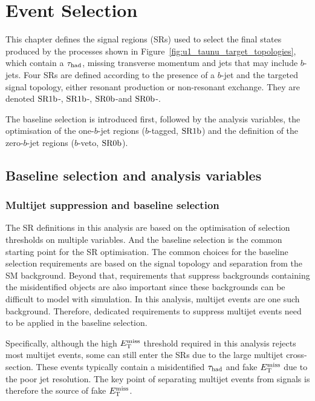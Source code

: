 \chapter{Event Selection}
\label{chapter:event_selection}
This chapter defines the signal regions (SRs) used to select the final states produced by the processes shown in Figure~\ref{fig:u1_taunu_target_topologies}, which contain a $\tau_{\mathrm{had}}$, missing transverse momentum and jets that may include $b$-jets. Four SRs are defined according to the presence of a $b$-jet and the targeted signal topology, either resonant production or non-resonant exchange. They are denoted $\mathrm{SR1b}$-\Res, $\mathrm{SR1b}$-\NonRes, $\mathrm{SR0b}$-\Res and $\mathrm{SR0b}$-\NonRes.

The baseline selection is introduced first, followed by the analysis variables, the optimisation of the one-$b$-jet regions ($b$-tagged, $\mathrm{SR1b}$) and the definition of the zero-$b$-jet regions ($b$-veto, $\mathrm{SR0b}$).

\section{Baseline selection and analysis variables}
\label{sec:ch7_baseline_selection}

\subsection{Multijet suppression and baseline selection}
\label{subsec:ch7_baseline_selection}

The SR definitions in this analysis are based on the optimisation of selection thresholds on multiple variables.
And the baseline selection is the common starting point for the SR optimisation. 
The common choices for the baseline selection requirements are based on the signal topology and separation from the SM background. 
Beyond that, requirements that suppress backgrounds containing the misidentified objects are also important since these backgrounds can be difficult to model with simulation. In this analysis, multijet events are one such background. Therefore, dedicated requirements to suppress multijet events need to be applied in the baseline selection.

Specifically, although the high $E_{\mathrm{T}}^{\mathrm{miss}}$ threshold required in this analysis rejects most multijet events, some can still enter the SRs due to the large multijet cross-section. These events typically contain a misidentified $\tau_{\mathrm{had}}$ and fake $E_{\mathrm{T}}^{\mathrm{miss}}$ due to the poor jet resolution. 
The key point of separating multijet events from signals is therefore the source of fake $E_{\mathrm{T}}^{\mathrm{miss}}$.

